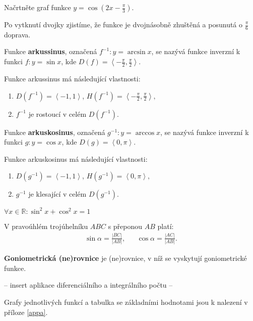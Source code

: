 \begin{priklad}
Načrtněte graf funkce $y=\cos (2x-\frac{\pi}{3}).$
\end{priklad}

\begin{reseni}
Po vytknutí dvojky zjistíme, že funkce je dvojnásobně zhuštěná a posunutá o $\frac{\pi}{6}$ doprava.
\end{reseni}

\begin{definition}[Arkussinus]
Funkce \textbf{arkussinus}, označená $f^{-1}: y=\arcsin x$, se nazývá funkce inverzní
k funkci $f: y=\sin x$, kde $D(f)=\left < -\frac{\pi}{2},\frac{\pi}{2} \right >$.
\end{definition}
\begin{pozn}
    Funkce arkussinus má následující vlastnosti:
    \begin{enumerate}
    \item $D(f^{-1}) = \left < -1, 1 \right >$, $H(f^{-1}) = \left < -\frac{\pi}{2},\frac{\pi}{2} \right >,$
    \item $f^{-1}$ je rostoucí v celém $D(f^{-1}).$
    \end{enumerate}
\end{pozn}


\begin{definition}[Arkuskosinus]
Funkce \textbf{arkuskosinus}, označená $g^{-1}: y=\arccos x$, se nazývá funkce inverzní
k funkci $g: y=\cos x$, kde $D(g)=\left < 0,\pi \right >$.
\end{definition}
\begin{pozn}
Funkce arkuskosinus má následující vlastnosti:
\begin{enumerate}
    \item $D(g^{-1}) = \left < -1, 1 \right >$, $H(g^{-1}) = \left < 0, \pi \right >,$
    \item $g^{-1}$ je klesající v celém $D(g^{-1}).$
\end{enumerate}
\end{pozn}

\begin{veta}
  $\forall x \in \mathbb{R}:\sin^2 x + \cos^2 x = 1$
\end{veta}

\begin{veta}
    V pravoúhlém trojúhelníku $ABC$ s přeponou $AB$ platí:
    \begin{align*}
        \sin \alpha = \frac{ |BC| }{ |AB| }, & & \cos \alpha = \frac{|AC|}{|AB|}.
    \end{align*}
\end{veta}

\begin{pozn}
    \textbf{Goniometrická (ne)rovnice} je (ne)rovnice, v níž se vyskytují goniometrické funkce.
\end{pozn}

-- insert aplikace diferenciálního a integrálního počtu --

\begin{pozn}
    Grafy jednotlivých funkcí a tabulka se základními hodnotami jsou k nalezení
    v příloze \ref{appa}.
\end{pozn}
